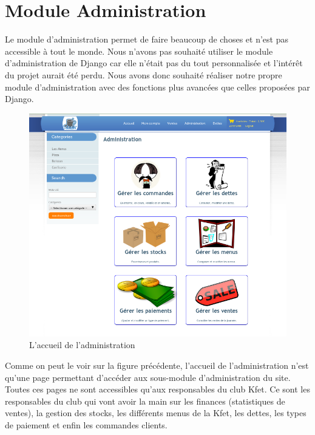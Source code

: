\documentclass[twoside,UTF8]{EPURapport}
\begin{document}
\chapter{Module Administration}

Le module d'administration permet de faire beaucoup de choses et n'est pas accessible à tout le monde. Nous n'avons pas
souhaité utiliser le module d'administration de Django car elle n'était pas du tout personnalisée et l'intérêt du projet
aurait été perdu. Nous avons donc souhaité réaliser notre propre module d'administration avec des fonctions plus
avancées que celles proposées par Django.

\begin{figure}[H]
    \centering
    \includegraphics[width=\linewidth]{./logos/administration.png}
    \caption{L'accueil de l'administration}
\end{figure}

Comme on peut le voir sur la figure précédente, l'accueil de l'administration n'est qu'une page permettant d'accéder aux
sous-module d'administration du site. Toutes ces pages ne sont accessibles qu'aux responsables du club Kfet. Ce sont les
responsables du club qui vont avoir la main sur les finances (statistiques de ventes), la gestion des stocks, les
différents menus de la Kfet, les dettes, les types de paiement et enfin les commandes clients.
\end{document}
